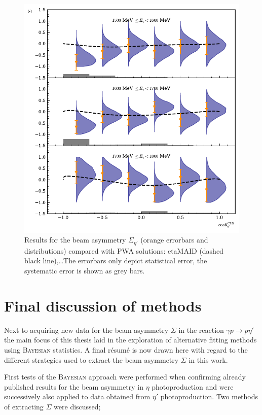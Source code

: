 \begin{figure}[htbp]
\centering
\includegraphics[width=\linewidth]{../bayes/etap_event_based_fit/plots/sigma_etap_pwa.pdf}
\caption{Results for the beam asymmetry $\Sigma_{\eta'}$ (orange errorbars and distributions) compared with PWA solutions:  etaMAID \cite{etaMAID}(dashed black line),\dots The errorbars only depict statistical error, the systematic error is shown as grey bars.}
\label{fig:pwa}
\end{figure}
\section{Final discussion of methods}
Next to acquiring new data for the beam asymmetry $\Sigma$ in the reaction $\gamma p\to p\eta'$ the main focus of this thesis laid in the exploration of alternative fitting methods using \textsc{Bayesian} statistics. A final r\'{e}sum\'{e} is now drawn here with regard to the different strategies used to extract the beam asymmetry $\Sigma$ in this work.

First tests of the \textsc{Bayesian} approach were performed when confirming already published results for the beam asymmetry in $\eta$ photoproduction \cite{farahphd,eta} and were successively also applied to data obtained from $\eta'$ photoproduction. Two methods of extracting $\Sigma$ were discussed;

